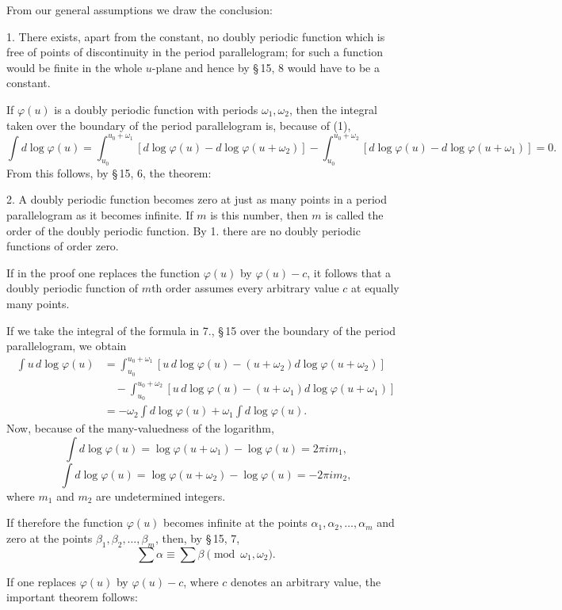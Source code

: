\documentclass[11pt]{article}
\begin{document}
From our general assumptions we draw the conclusion:

1. There exists, apart from the constant, no doubly periodic function which is free of points of discontinuity in the period parallelogram; for such a function would be finite in the whole $u$-plane and hence by \S\,15, 8 would have to be a constant.

If $\varphi(u)$ is a doubly periodic function with periods $\omega_1,\omega_2$, then the integral taken over the boundary of the period parallelogram is, because of (1),
\[
\int d\log\varphi(u)
=\int_{u_0}^{u_0+\omega_1}\!\!\left[d\log\varphi(u)-d\log\varphi(u+\omega_2)\right]
-\int_{u_0}^{u_0+\omega_2}\!\!\left[d\log\varphi(u)-d\log\varphi(u+\omega_1)\right]
=0.
\]
From this follows, by \S\,15, 6, the theorem:

2. A doubly periodic function becomes zero at just as many points in a period parallelogram as it becomes infinite. If $m$ is this number, then $m$ is called the order of the doubly periodic function. By 1. there are no doubly periodic functions of order zero.

If in the proof one replaces the function $\varphi(u)$ by $\varphi(u)-c$, it follows that a doubly periodic function of $m$th order assumes every arbitrary value $c$ at equally many points.

If we take the integral of the formula in 7., \S\,15 over the boundary of the period parallelogram, we obtain
\begin{align*}
\int u\,d\log\varphi(u)
&=\int_{u_0}^{u_0+\omega_1}\!\!\left[u\,d\log\varphi(u)-(u+\omega_2)d\log\varphi(u+\omega_2)\right]\\
&\quad-\int_{u_0}^{u_0+\omega_2}\!\!\left[u\,d\log\varphi(u)-(u+\omega_1)d\log\varphi(u+\omega_1)\right]\\
&=-\omega_2\int d\log\varphi(u)+\omega_1\int d\log\varphi(u).
\end{align*}
Now, because of the many-valuedness of the logarithm,
\[
\int d\log\varphi(u)=\log\varphi(u+\omega_1)-\log\varphi(u)=2\pi i m_1,
\]
\[
\int d\log\varphi(u)=\log\varphi(u+\omega_2)-\log\varphi(u)=-2\pi i m_2,
\]
where $m_1$ and $m_2$ are undetermined integers.

If therefore the function $\varphi(u)$ becomes infinite at the points $\alpha_1,\alpha_2,\ldots,\alpha_m$ and zero at the points $\beta_1,\beta_2,\ldots,\beta_m$, then, by \S\,15, 7,
\[
\sum \alpha \equiv \sum \beta\pmod{\omega_1,\omega_2}.
\]

If one replaces $\varphi(u)$ by $\varphi(u)-c$, where $c$ denotes an arbitrary value, the important theorem follows:
\end{document}
